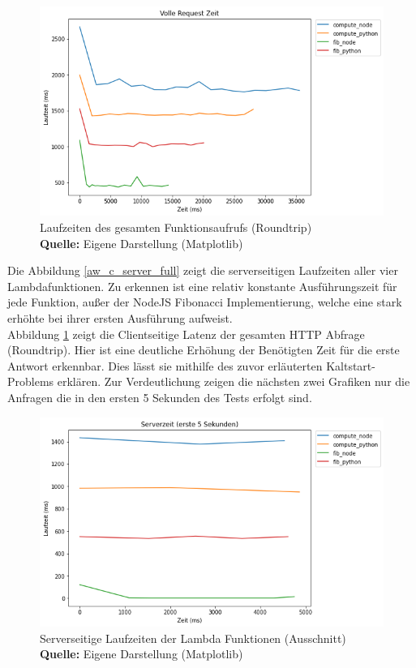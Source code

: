 \documentclass[12pt,a4paper,parskip=half]{scrreprt}
\newcommand*{\captionsource}[2]{%
	\caption[{#1}]{%
		#1%
		\\\hspace{\linewidth}%
		\textbf{Quelle:} #2%
	}%
}
\begin{document}
\FloatBarrier
\begin{figure}[h!]
	\centering
	\includegraphics[scale=0.7]{aw_c_client_full}
	\captionsource{Laufzeiten des gesamten Funktionsaufrufs (Roundtrip)}
	{Eigene Darstellung (Matplotlib)}
	\label{aw_c_client_full}
\end{figure}
\FloatBarrier

Die Abbildung \ref{aw_c_server_full} zeigt die serverseitigen Laufzeiten aller vier Lambdafunktionen. Zu erkennen ist eine relativ konstante Ausführungszeit für jede Funktion, außer der NodeJS Fibonacci Implementierung, welche eine stark erhöhte bei ihrer ersten Ausführung aufweist.
\\

Abbildung \ref{aw_c_client_full} zeigt die Clientseitige Latenz der gesamten HTTP Abfrage (Roundtrip). Hier ist eine deutliche Erhöhung der Benötigten Zeit für die erste Antwort erkennbar. Dies lässt sie mithilfe des zuvor erläuterten Kaltstart-Problems erklären. Zur Verdeutlichung zeigen die nächsten zwei Grafiken nur die Anfragen die in den ersten 5 Sekunden des Tests erfolgt sind.

\FloatBarrier
\begin{figure}[h!]
	\centering
	\includegraphics[scale=0.7]{aw_c_server_start}
	\captionsource{Serverseitige Laufzeiten der Lambda Funktionen (Ausschnitt)}
	{Eigene Darstellung (Matplotlib)}
	\label{aw_c_server_start}
\end{figure}
\FloatBarrier
\end{document}

